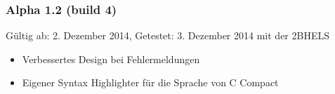 \subsubsection*{Alpha 1.2 (build 4)}
Gültig ab: 2. Dezember 2014,
Getestet: 3. Dezember 2014 mit der 2BHELS
\begin{itemize}
\item Verbessertes Design bei Fehlermeldungen
\item Eigener Syntax Highlighter für die Sprache von C Compact
\end{itemize}


